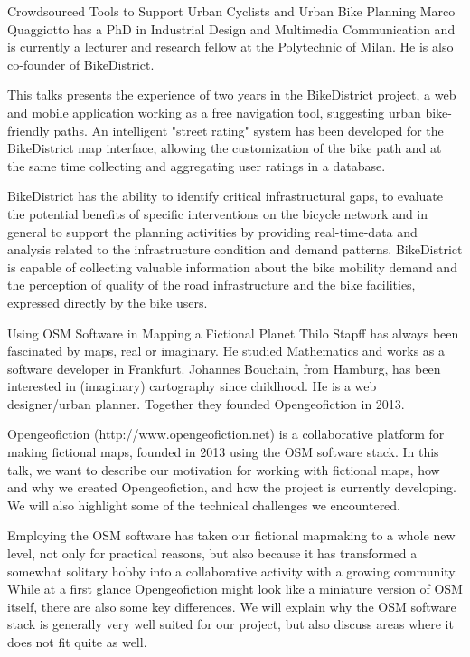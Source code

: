 %
{Crowdsourced Tools to Support Urban Cyclists and Urban Bike Planning}%
{Marco Quaggiotto has a PhD in Industrial Design and Multimedia Communication and is currently a lecturer and research fellow at the Polytechnic of Milan. He is also co-founder of BikeDistrict.}
{This talks presents the experience of two years in the BikeDistrict project, a 
web and mobile application working as a free navigation tool, suggesting urban bike-friendly paths. 
An intelligent "street rating" system has been developed for the BikeDistrict map interface, allowing the customization of the bike path and at the same time collecting and aggregating user ratings in a database.
 
BikeDistrict has the ability to identify critical infrastructural gaps, to evaluate the potential benefits of specific interventions on the bicycle network and in general to support the planning activities by providing real-time-data and analysis related to the infrastructure condition and demand patterns. BikeDistrict is capable of collecting valuable information about the bike mobility demand and the perception of quality of the road infrastructure and the bike facilities, expressed directly by the bike users. }

%
{Using OSM Software in Mapping a Fictional Planet}%
{Thilo Stapff has always been fascinated by maps, real or imaginary. 
He studied Mathematics and works as a software developer in Frankfurt. Johannes Bouchain, from Hamburg, has been interested in (imaginary) cartography since childhood. He is a web designer/urban planner. Together they founded Opengeofiction in 2013.  }%
{Opengeofiction (http://www.opengeofiction.net) is a collaborative platform for making fictional maps, founded in 2013 using the OSM software stack. In this talk, we want to describe our motivation for working with fictional maps, how and why we created Opengeofiction, and how the project is currently developing. We will also highlight some of the technical challenges we encountered.

Employing the OSM software has taken our fictional mapmaking to a whole new level, not only for practical reasons, but also because it has transformed a somewhat solitary hobby into a collaborative activity with a growing community. While at a first glance Opengeofiction might look like a miniature version of OSM itself, there are also some key differences. We will explain why the OSM software stack is generally very well suited for our project, but also discuss areas where it does not fit quite as well.
}

